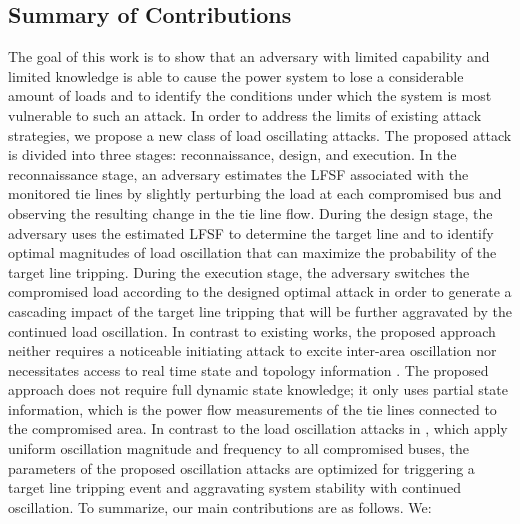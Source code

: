\documentclass[journal]{IEEEtran}
\begin{document}
\subsection{Summary of Contributions}
The goal of this work is to show that an adversary with limited capability and limited knowledge is able to cause the power system to lose a considerable amount of loads and to identify the conditions under which the system is most vulnerable to such an attack.
In order to address the limits of existing attack strategies, we propose a new class of load oscillating attacks. The proposed attack is divided into three stages: reconnaissance, design, and execution. In the reconnaissance stage, an adversary estimates the LFSF associated with the monitored tie lines by slightly perturbing the load at each compromised bus and observing the resulting change in the tie line flow. During the design stage, the adversary uses the estimated LFSF to determine the target line and to identify optimal magnitudes of load oscillation that can maximize the probability of the target line tripping. During the execution stage, the adversary switches the compromised load according to the designed optimal attack in order to generate a cascading impact of the target line tripping that will be further aggravated by the continued load oscillation. 
In contrast to existing works, the proposed approach neither requires a noticeable initiating attack to excite inter-area oscillation \cite{interarea} nor necessitates access to real time state and topology information \cite{ESS}. The proposed approach does not require full dynamic state knowledge; it only uses partial state information, which is the power flow measurements of the tie lines connected to the compromised area. 
In contrast to the load oscillation attacks in \cite{Anu,carter}, which apply uniform oscillation magnitude and frequency to all compromised buses, the parameters of the proposed oscillation attacks are optimized for triggering a target line tripping event and aggravating system stability with continued oscillation. To summarize, our main contributions are as follows. We:
\end{document}
